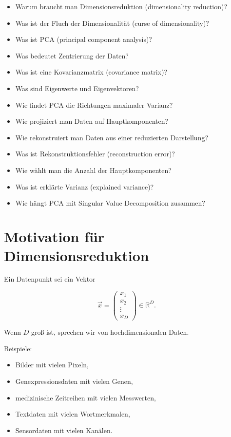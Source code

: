 \begin{itemize}
    \item Warum braucht man Dimensionsreduktion (dimensionality reduction)?
    \item Was ist der Fluch der Dimensionalität (curse of dimensionality)?
    \item Was ist PCA (principal component analysis)?
    \item Was bedeutet Zentrierung der Daten?
    \item Was ist eine Kovarianzmatrix (covariance matrix)?
    \item Was sind Eigenwerte und Eigenvektoren?
    \item Wie findet PCA die Richtungen maximaler Varianz?
    \item Wie projiziert man Daten auf Hauptkomponenten?
    \item Wie rekonstruiert man Daten aus einer reduzierten Darstellung?
    \item Was ist Rekonstruktionsfehler (reconstruction error)?
    \item Wie wählt man die Anzahl der Hauptkomponenten?
    \item Was ist erklärte Varianz (explained variance)?
    \item Wie hängt PCA mit Singular Value Decomposition zusammen?
\end{itemize}

\section{Motivation für Dimensionsreduktion}

Ein Datenpunkt sei ein Vektor

\[
    \vec{x}
    =
    \begin{pmatrix}
        x_1 \\
        x_2 \\
        \vdots \\
        x_D
    \end{pmatrix}
    \in \mathbb{R}^D.
\]

Wenn \(D\) groß ist, sprechen wir von hochdimensionalen Daten.

Beispiele:

\begin{itemize}
    \item Bilder mit vielen Pixeln,
    \item Genexpressionsdaten mit vielen Genen,
    \item medizinische Zeitreihen mit vielen Messwerten,
    \item Textdaten mit vielen Wortmerkmalen,
    \item Sensordaten mit vielen Kanälen.
\end{itemize}


